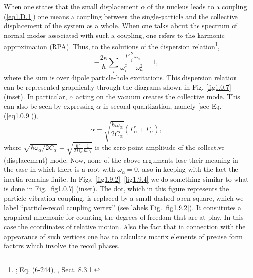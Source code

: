 \begin{subappendices}
When one states that the small displacement 
$\alpha$ of the nucleus leads to a coupling (\ref{eq1.D.1}) one means a coupling between the
single-particle and the collective displacement of the system as a whole. When one talks about the spectrum of normal modes 
associated  with such a coupling, one refers to the harmonic approximation (RPA). Thus, to the solutions of the dispersion relation\footnote{\cite{Bohr:75}; Eq. (6-244), \cite{Brink:05}, Sect. 8.3.1.},
\begin{equation}\label{eq1.D.5x}
- \frac{2 \kappa}{\hbar} \sum_i \frac{|F|_i^2 \omega_i}{\omega_i^2 - \omega_a^2} = 1,
\end{equation}
where the sum is over  dipole particle-hole excitations. This dispersion relation can be represented graphically 
through the diagrams shown in Fig. \ref{fig1.0.7} (inset). In particular, 
$\alpha$ acting on the vacuum creates the collective mode. This can also be seen by expressing $\alpha$ in second quantization, namely (see Eq. (\ref{eq1.0.9})),
\begin{equation}
\alpha = \sqrt { \frac{\hbar \omega_{\alpha}}{2C_{\alpha}} }
 (\Gamma_{\alpha}^{\dagger} + \Gamma_{\alpha}),
  \end{equation}
  where $\sqrt{ \hbar \omega_{\alpha}/2 C_{\alpha}} = \sqrt{\frac{\hbar^2}{2D_{\alpha} }\frac{1}{\hbar \omega_{\alpha}}}$ is the zero-point amplitude
of the collective (displacement) mode. 
Now, none of the above arguments lose their meaning  in the case in which there is a root with $\omega_{\alpha}= 0$, 
also in keeping  with the fact the  inertia remains finite. 
In Figs. \ref{fig1.9.2}--\ref{fig1.9.4} we do something   similar to what is done in Fig. \ref{fig1.0.7} (inset). The dot, which in this figure represents the particle-vibration coupling, is 
replaced by a small dashed open square, which we  label ``particle-recoil coupling vertex'' (see labels Fig. \ref{fig1.9.2}). It constitutes a graphical mnemonic 
for counting  the degrees of freedom that are at play. In this case the coordinates of relative motion. Also the fact that in connection with the appearance of 
such vertices one has to calculate matrix elements of precise form factors which involve the recoil phases. 



\end{subappendices}
